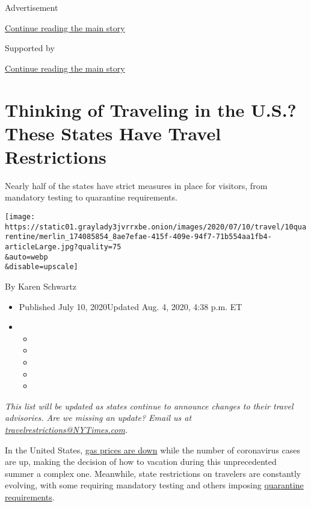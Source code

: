 Advertisement

\protect\hyperlink{after-top}{Continue reading the main story}

Supported by

\protect\hyperlink{after-sponsor}{Continue reading the main story}

\hypertarget{thinking-of-traveling-in-the-us-these-states-have-travel-restrictions}{%
\section{Thinking of Traveling in the U.S.? These States Have Travel
Restrictions}\label{thinking-of-traveling-in-the-us-these-states-have-travel-restrictions}}

Nearly half of the states have strict measures in place for visitors,
from mandatory testing to quarantine requirements.

\texttt{[image: https://static01.graylady3jvrrxbe.onion/images/2020/07/10/travel/10quarentine/merlin\_174085854\_8ae7efae-415f-409e-94f7-71b554aa1fb4-articleLarge.jpg?quality=75\\\&auto=webp\\\&disable=upscale]}

By Karen Schwartz

\begin{itemize}
\item
  Published July 10, 2020Updated Aug. 4, 2020, 4:38 p.m. ET
\item
  \begin{itemize}
  \item
  \item
  \item
  \item
  \item
  \end{itemize}
\end{itemize}

\emph{This list will be updated as states continue to announce changes
to their travel advisories. Are we missing an update? Email us at}
\href{mailto:travelrestrictions@NYTimes.com}{\emph{travelrestrictions@NYTimes.com}}\emph{.}

In the United States,
\href{https://gasprices.aaa.com/national-average-decreases-as-gas-demand-remains-low/}{gas
prices are down} while the number of coronavirus cases are up, making
the decision of how to vacation during this unprecedented summer a
complex one. Meanwhile, state restrictions on travelers are constantly
evolving, with some requiring mandatory testing and others imposing
\href{https://www.cdc.gov/quarantine/index.html}{quarantine
requirements}.

